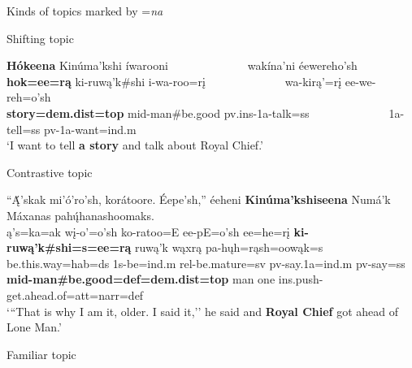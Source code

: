 \begin{exe}

\item\label{NAkindsoftopics} Kinds of topics marked by =\textit{na}

    \begin{xlist}
        \item\label{NAkindsoftopicsA} Shifting topic

        \glll \textbf{Hókeena} Kinúma'kshi íwarooni ~ ~ ~ ~ ~ ~ ~ ~ wakína'ni éewereho'sh\\ 
        \textbf{hok=ee=rą} ki-ruwą'k\#shi i-wa-roo=rį ~ ~ ~ ~ ~ ~ ~ ~ wa-kirą'=rį ee-we-reh=o'sh\\
        \textnormal{\bfseries story}\textbf{=dem.dist=top} mid-\textnormal{man}\#\textnormal{be.good} pv.ins-1a-\textnormal{talk}=ss ~ ~ ~ ~ ~ ~ ~ ~ 1a-\textnormal{tell}=ss pv-1a-\textnormal{want}=ind.m\\
        \glt `I want to tell \textbf{a story} and talk about Royal Chief.' \citep[20]{hollow1973a}

        \item\label{NAkindsoftopicsB} Contrastive topic

        \glll ``Ą́'skak mi'ó'ro'sh, korátoore. Éepe'sh,'' éeheni \textbf{Kinúma'kshiseena} Numá'k Máxanas pahų́hanashoomaks.\\ 
        ą's=ka=ak wį-o'=o'sh ko-ratoo=E ee-pE=o'sh ee=he=rį \textbf{ki-ruwą'k\#shi=s=ee=rą} ruwą'k wąxrą pa-hųh=rąsh=oowąk=s\\ 
        \textnormal{be.this.way}=hab=ds 1s-\textnormal{be}=ind.m rel-\textnormal{be.mature}=sv pv-\textnormal{say}.1a=ind.m pv-\textnormal{say}=ss \textbf{mid-\textnormal{\bfseries man}\#\textnormal{\bfseries be.good}=def=dem.dist=top} \textnormal{man} \textnormal{one} ins.push-\textnormal{get.ahead.of}=att=narr=def\\
        \glt `{``}That is why I am it, older. I said it,'' he said and \textbf{Royal Chief} got ahead of Lone Man.' \citep[9]{hollow1973a}

        \item\label{NAkindsoftopicsC} Familiar topic


\end{xlist}
\end{exe}

